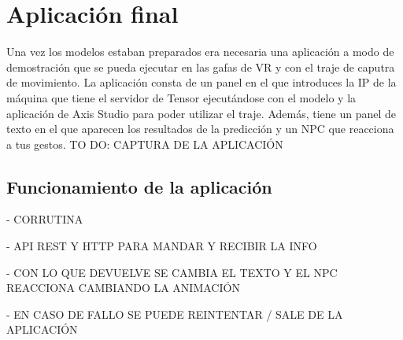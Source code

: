 \section{Aplicación final}
\label{sec:aplicacionFinal}
Una vez los modelos estaban preparados era necesaria una aplicación a modo de demostración que se pueda ejecutar en las gafas de VR y con el traje de caputra de movimiento.
La aplicación consta de un panel en el que introduces la IP de la máquina que tiene el servidor de Tensor ejecutándose con el modelo y la aplicación de Axis Studio para poder utilizar el traje.
Además, tiene un panel de texto en el que aparecen los resultados de la predicción y un NPC que reacciona a tus gestos.
TO DO: CAPTURA DE LA APLICACIÓN
\subsection{Funcionamiento de la aplicación}
- CORRUTINA

- API REST Y HTTP PARA MANDAR Y RECIBIR LA INFO

- CON LO QUE DEVUELVE SE CAMBIA EL TEXTO Y EL NPC REACCIONA CAMBIANDO LA ANIMACIÓN

- EN CASO DE FALLO SE PUEDE REINTENTAR / SALE DE LA APLICACIÓN